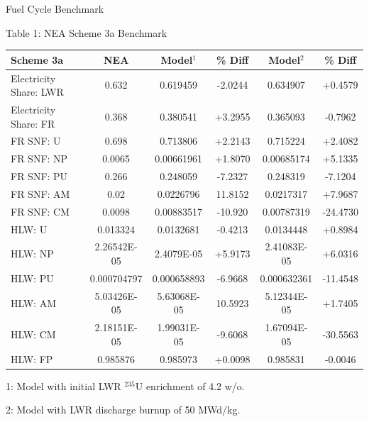 \documentclass[pdf, autumn, slideColor, nocolorBG]{prosper}
\newcommand{\superscript}[1]{\ensuremath{^{\textrm{#1}}}}
\newcommand{\nuc}[2]{\superscript{#2}{#1}}
\newcommand{\FigCaption}[1]{\begin{center}{\tiny{#1}}\end{center}}
\begin{document}
\begin{slide}{Fuel Cycle Benchmark}
\tiny
\begin{center}
\FigCaption{Table 1: NEA Scheme 3a Benchmark}
\begin{tabular}{|l||c||c|c||c|c|}
\hline
\textbf{Scheme 3a}     & \textbf{NEA} & \textbf{Model\superscript{1}} & \textbf{\% Diff} & \textbf{Model\superscript{2}} & \textbf{\% Diff} \\
\hline
Electricity Share: LWR & 0.632       & 0.619459             & -2.0244 & 0.634907             & +0.4579 \\
\hline
Electricity Share: FR  & 0.368       & 0.380541             & +3.2955 & 0.365093             & -0.7962 \\
\hline
FR SNF: U              & 0.698       & 0.713806             & +2.2143 & 0.715224             & +2.4082 \\
\hline
FR SNF: NP             & 0.0065      & 0.00661961           & +1.8070 & 0.00685174           & +5.1335 \\
\hline
FR SNF: PU             & 0.266       & 0.248059             & -7.2327 & 0.248319             & -7.1204 \\
\hline
FR SNF: AM             & 0.02        & 0.0226796            & 11.8152 & 0.0217317            & +7.9687 \\
\hline
FR SNF: CM             & 0.0098      & 0.00883517           & -10.920 & 0.00787319           & -24.4730\\
\hline
HLW: U                 & 0.013324    & 0.0132681            & -0.4213 & 0.0134448            & +0.8984 \\
\hline
HLW: NP                & 2.26542E-05 & 2.4079E-05           & +5.9173 & 2.41083E-05          & +6.0316 \\
\hline
HLW: PU                & 0.000704797 & 0.000658893          & -6.9668 & 0.000632361          & -11.4548\\
\hline
HLW: AM                & 5.03426E-05 & 5.63068E-05          & 10.5923 & 5.12344E-05          & +1.7405 \\
\hline
HLW: CM                & 2.18151E-05 & 1.99031E-05          & -9.6068 & 1.67094E-05          & -30.5563\\
\hline
HLW: FP                & 0.985876    & 0.985973             & +0.0098 & 0.985831             & -0.0046 \\
\hline
\end{tabular}
\end{center}

1: Model with initial LWR \nuc{U}{235} enrichment of 4.2 w/o. 

2: Model with LWR discharge burnup of 50 MWd/kg.
\end{slide}
\end{document}
